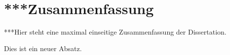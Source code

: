 \chapter*{***Zusammenfassung}

***Hier steht eine maximal einseitige Zusammenfassung der
Dissertation.

Dies ist ein neuer Absatz.

